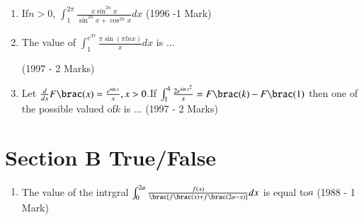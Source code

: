 \documentclass[journal,12pt,twocolumn]{IEEEtran}
\theoremstyle{remark}
\begin{document}
\begin{enumerate}
\item If$ n>0$, $\int_1^{2\pi} \frac {x \sin ^{2n}x}{\sin ^{2n} x + \cos ^{2n} x} dx $
\hfill{\brac(1996 -1 Mark)}\\
		
\item The value of $\int_1^{e^{37}} \frac {\pi \sin (\pi lnx)}{x} dx$ is ...

\hfill{\brac(1997 - 2 Marks)}\\
		
\item Let $\frac {d}{dx}F\brac(x)=\frac {e^{\sin x}}{x},x>0$.If $\int_1^4 \frac{2e^{\sin x^2}}{x}=F\brac(k)-F\brac(1)$ then one of the possible valued of$ k$ is ...
\hfill{\brac(1997 - 2 Marks)}\\
\end{enumerate}
\section{Section B True/False}
\begin{enumerate}
\item The value of the intrgral $\int_0^{2a} \frac{f(x)}{\brac[f\brac(x)+f\brac(2a-x)]}dx$ is equal to$ a$
\hfill{\brac(1988 - 1 Mark)}\\
\end{enumerate}
\end{document}
